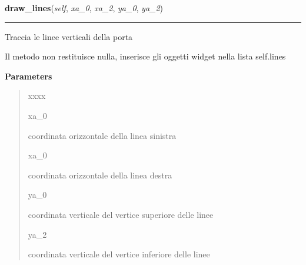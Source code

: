 \hspace{.8\funcindent}\begin{boxedminipage}{\funcwidth}

    \raggedright \textbf{draw\_lines}(\textit{self}, \textit{xa\_0}, \textit{xa\_2}, \textit{ya\_0}, \textit{ya\_2})

    \vspace{-1.5ex}

    \rule{\textwidth}{0.5\fboxrule}
\setlength{\parskip}{2ex}
    Traccia le linee verticali della porta

    Il metodo non restituisce nulla, inserisce gli oggetti widget nella 
    lista self.lines

\setlength{\parskip}{1ex}
      \textbf{Parameters}
      \vspace{-1ex}

      \begin{quote}
        \begin{Ventry}{xxxx}

          \item[xa\_0]

          coordinata orizzontale della linea sinistra

          \item[xa\_0]

          coordinata orizzontale della linea destra

          \item[ya\_0]

          coordinata verticale del vertice superiore delle linee

          \item[ya\_2]

          coordinata verticale del vertice inferiore delle linee

        \end{Ventry}

      \end{quote}

    \end{boxedminipage}

    \label{component:Or:draw_bottom}

    \vspace{0.5ex}

